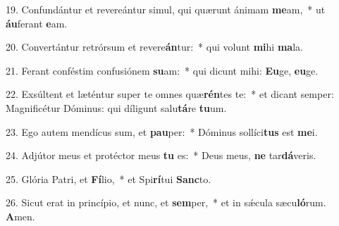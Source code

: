 19. Confundántur et revereántur simul, qui quærunt ánimam \textbf{me}am,~*  ut \textbf{áu}ferant \textbf{e}am.\

20. Convertántur retrórsum et revere\textbf{án}tur:~*  qui volunt \textbf{mi}hi \textbf{ma}la.\

21. Ferant conféstim confusiónem \textbf{su}am:~*  qui dicunt mihi: \textbf{Eu}ge, \textbf{eu}ge.\

22. Exsúltent et læténtur super te omnes quæ\textbf{rén}tes te:~*  et dicant semper: Magnificétur Dóminus: qui díligunt salu\textbf{tá}re \textbf{tu}um.\

23. Ego autem mendícus sum, et \textbf{pau}per:~*  Dóminus sollíci\textbf{tus} est \textbf{me}i.\

24. Adjútor meus et protéctor meus \textbf{tu} es:~*  Deus meus, \textbf{ne} tar\textbf{dá}veris.\

25. Glória Patri, et \textbf{Fí}lio,~*  et Spi\textbf{rí}tui \textbf{Sanc}to.\

26. Sicut erat in princípio, et nunc, et \textbf{sem}per,~*  et in sǽcula sæcu\textbf{ló}rum. \textbf{A}men.\


